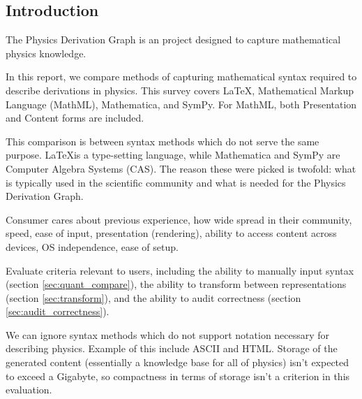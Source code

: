 \documentclass{article}
\begin{document}
\begin{multicols}{2}





\section{Introduction}

The Physics Derivation Graph is an project designed to capture mathematical physics knowledge. 


In this report, we compare methods of capturing mathematical syntax required to describe derivations in physics. This survey covers \LaTeX, Mathematical Markup Language (MathML)\cite{2014_MathML}, Mathematica\cite{2014_mathematica}, and SymPy\cite{2014_SymPy}. For MathML, both Presentation and Content forms are included.

This comparison is between syntax methods which do not serve the same purpose. \LaTeX is a type-setting language, while Mathematica and SymPy are Computer Algebra Systems (CAS). The reason these were picked is twofold: what is typically used in the scientific community and what is needed for the Physics Derivation Graph. 

Consumer cares about previous experience, how wide spread in their community, speed, ease of input, presentation (rendering), ability to access content across devices, OS independence, ease of setup. 

Evaluate criteria relevant to users, including the ability to manually input syntax (section \ref{sec:quant_compare}), the ability to transform between representations (section \ref{sec:transform}), and the ability to audit correctness (section \ref{sec:audit_correctness}).

We can ignore syntax methods which do not support notation necessary for describing physics. Example of this include ASCII\cite{1968_ASCII} and HTML\cite{1999_HTML}. Storage of the generated content (essentially a knowledge base for all of physics) isn't expected to exceed a Gigabyte, so compactness in terms of storage isn't a criterion in this evaluation.


\end{multicols}
\end{document}
